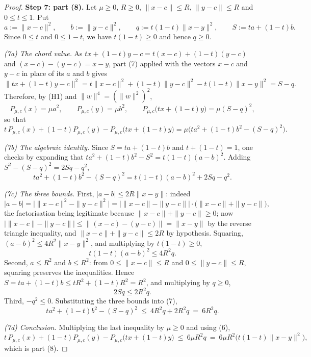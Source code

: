 \begin{proof}
\medskip\noindent\textbf{Step 7: part (8).} Let $\mu\ge0$, $R\ge0$, $\|x-c\|\le R$,
$\|y-c\|\le R$ and $0\le t\le1$. Put
\[
 a:=\|x-c\|^{2},\qquad b:=\|y-c\|^{2},\qquad q:=t(1-t)\|x-y\|^{2},\qquad
 S:=t a+(1-t)b .
\]
Since $0\le t$ and $0\le1-t$, we have $t(1-t)\ge0$ and hence $q\ge0$.

\emph{(7a) The chord value.} As $t x+(1-t)y-c=t(x-c)+(1-t)(y-c)$ and
$(x-c)-(y-c)=x-y$, part (7) applied with the vectors $x-c$ and $y-c$ in place of its $a$
and $b$ gives
\[
 \big\|t x+(1-t)y-c\big\|^{2}=t\|x-c\|^{2}+(1-t)\|y-c\|^{2}-t(1-t)\|x-y\|^{2}=S-q .
\]
Therefore, by (H1) and $\|w\|^{4}=(\|w\|^{2})^{2}$,
\[
 P_{\mu,c}(x)=\mu a^{2},\qquad P_{\mu,c}(y)=\mu b^{2},\qquad
 P_{\mu,c}\big(t x+(1-t)y\big)=\mu(S-q)^{2},
\]
so that
\[
 t\,P_{\mu,c}(x)+(1-t)P_{\mu,c}(y)-P_{\mu,c}\big(t x+(1-t)y\big)
  =\mu\Big(t a^{2}+(1-t)b^{2}-(S-q)^{2}\Big). \tag{6}
\]

\emph{(7b) The algebraic identity.} Since $S=t a+(1-t)b$ and $t+(1-t)=1$, one checks by
expanding that $t a^{2}+(1-t)b^{2}-S^{2}=t(1-t)(a-b)^{2}$. Adding
$S^{2}-(S-q)^{2}=2Sq-q^{2}$,
\[
 t a^{2}+(1-t)b^{2}-(S-q)^{2}=t(1-t)(a-b)^{2}+2Sq-q^{2}. \tag{7}
\]

\emph{(7c) The three bounds.} First, $|a-b|\le2R\|x-y\|$: indeed
\[
 |a-b|=\Big|\|x-c\|^{2}-\|y-c\|^{2}\Big|
  =\Big|\|x-c\|-\|y-c\|\Big|\cdot\Big(\|x-c\|+\|y-c\|\Big),
\]
the factorisation being legitimate because $\|x-c\|+\|y-c\|\ge0$; now
$\big|\|x-c\|-\|y-c\|\big|\le\|(x-c)-(y-c)\|=\|x-y\|$ by the reverse triangle inequality,
and $\|x-c\|+\|y-c\|\le2R$ by hypothesis. Squaring, $(a-b)^{2}\le4R^{2}\|x-y\|^{2}$, and
multiplying by $t(1-t)\ge0$,
\[
 t(1-t)(a-b)^{2}\le4R^{2}q .
\]
Second, $a\le R^{2}$ and $b\le R^{2}$: from $0\le\|x-c\|\le R$ and $0\le\|y-c\|\le R$,
squaring preserves the inequalities. Hence
$S=t a+(1-t)b\le tR^{2}+(1-t)R^{2}=R^{2}$, and multiplying by $q\ge0$,
\[
 2Sq\le2R^{2}q .
\]
Third, $-q^{2}\le0$. Substituting the three bounds into (7),
\[
 t a^{2}+(1-t)b^{2}-(S-q)^{2}\ \le\ 4R^{2}q+2R^{2}q\ =\ 6R^{2}q .
\]

\emph{(7d) Conclusion.} Multiplying the last inequality by $\mu\ge0$ and using (6),
\[
 t\,P_{\mu,c}(x)+(1-t)P_{\mu,c}(y)-P_{\mu,c}\big(t x+(1-t)y\big)
  \ \le\ 6\mu R^{2}q\ =\ 6\mu R^{2}\big(t(1-t)\|x-y\|^{2}\big),
\]
which is part (8).
\end{proof}
